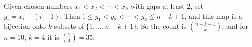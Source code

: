 Given chosen numbers $x_1<x_2<\cdots<x_k$ with gaps at least $2$, set $y_i=x_i-(i-1)$. Then $1\le y_1<y_2<\cdots<y_k\le n-k+1$, and this map is a bijection onto $k$-subsets of $\{1,\dots,n-k+1\}$. So the count is $\boxed{\binom{n-k+1}{k}}$, and for $n=10$, $k=4$ it is $\binom74=\boxed{35}$.
